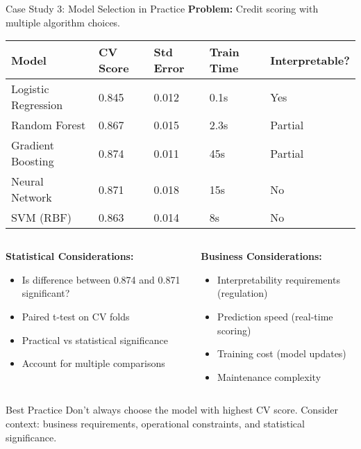 \documentclass[aspectratio=169,11pt]{beamer}
\begin{document}
\begin{frame}{Case Study 3: Model Selection in Practice}
\textbf{Problem:} Credit scoring with multiple algorithm choices.

\begin{table}
\centering
\small
\begin{tabular}{p{2.5cm}p{2cm}p{2cm}p{2cm}p{2cm}}
\toprule
\textbf{Model} & \textbf{CV Score} & \textbf{Std Error} & \textbf{Train Time} & \textbf{Interpretable?} \\
\midrule
Logistic Regression & 0.845 & 0.012 & 0.1s & Yes \\
Random Forest & 0.867 & 0.015 & 2.3s & Partial \\
Gradient Boosting & 0.874 & 0.011 & 45s & Partial \\
Neural Network & 0.871 & 0.018 & 15s & No \\
SVM (RBF) & 0.863 & 0.014 & 8s & No \\
\bottomrule
\end{tabular}
\end{table}

\begin{columns}
\begin{column}{0.5\textwidth}
\textbf{Statistical Considerations:}
\begin{itemize}
\item Is difference between 0.874 and 0.871 significant?
\item Paired t-test on CV folds
\item Practical vs statistical significance
\item Account for multiple comparisons
\end{itemize}
\end{column}
\begin{column}{0.5\textwidth}
\textbf{Business Considerations:}
\begin{itemize}
\item Interpretability requirements (regulation)
\item Prediction speed (real-time scoring)
\item Training cost (model updates)
\item Maintenance complexity
\end{itemize}
\end{column}
\end{columns}

\begin{alertblock}{Best Practice}
Don't always choose the model with highest CV score. Consider context: business requirements, operational constraints, and statistical significance.
\end{alertblock}
\end{frame}
\end{document}
